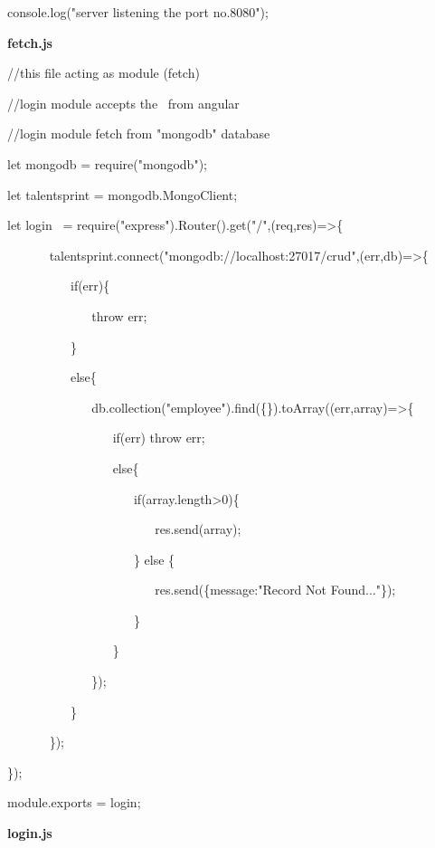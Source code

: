 \documentclass[
]{article}
\begin{document}
console.log("server listening the port no.8080");

\hfill    

\newpage
{\textbf{fetch.js}}

//this file acting as module (fetch)

//login module accepts the{~ }from angular

//login module fetch from "mongodb" database

\hfill    



let mongodb = require("mongodb");

let talentsprint = mongodb.MongoClient; {~}

\hfill    

let login{~ }=
require("express").Router().get("/",(req,res)=\textgreater\{

{~ ~ ~ ~
}talentsprint.connect("mongodb://localhost:27017/crud",(err,db)=\textgreater\{

{~ ~ ~ ~ ~ ~ }if(err)\{

{~ ~ ~ ~ ~ ~ ~ ~ }throw err;

{~ ~ ~ ~ ~ ~ }\}

{~ ~ ~ ~ ~ ~ }else\{

{~ ~ ~ ~ ~ ~ ~ ~
}db.collection("employee").find(\{\}).toArray((err,array)=\textgreater\{

{~ ~ ~ ~ ~ ~ ~ ~ ~ ~ }if(err) throw err;

{~ ~ ~ ~ ~ ~ ~ ~ ~ ~ }else\{

{~ ~ ~ ~ ~ ~ ~ ~ ~ ~ ~ ~ }if(array.length\textgreater0)\{

{~ ~ ~ ~ ~ ~ ~ ~ ~ ~ ~ ~ ~ ~ }res.send(array); {~ ~ ~ ~ ~ ~ ~ ~ ~ ~}

{~ ~ ~ ~ ~ ~ ~ ~ ~ ~ ~ ~ }\} else \{

{~ ~ ~ ~ ~ ~ ~ ~ ~ ~ ~ ~ ~ ~ }res.send(\{message:"Record Not
Found..."\});

{~ ~ ~ ~ ~ ~ ~ ~ ~ ~ ~ ~ }\}

{~ ~ ~ ~ ~ ~ ~ ~ ~ ~ }\}

{~ ~ ~ ~ ~ ~ ~ ~ }\});

{~ ~ ~ ~ ~ ~ }\}

{~ ~ ~ ~ }\});

\});

module.exports = login;

\hfill    

\newpage
{\textbf{login.js}}

{\textbf{}}\strut \\
\end{document}
